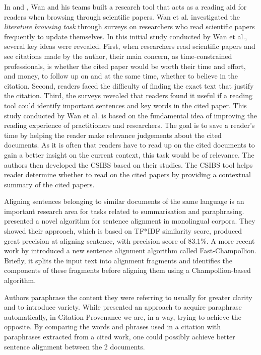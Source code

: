 In \cite{citation-sensitive} and \cite{csibs}, Wan and his teams built a research tool that acts as a reading aid for readers when browsing through scientific papers. Wan et al. investigated the \textit{literature browsing task} through surveys on researchers who read scientific papers frequently to update themselves. In this initial study conducted by Wan et al., several key ideas were revealed. First, when researchers read scientific papers and see citations made by the author, their main concern, as time-constrained professionals, is whether the cited paper would be worth their time and effort, and money, to follow up on and at the same time, whether to believe in the citation. Second, readers faced the difficulty of finding the exact text that justify the citation. Third, the surveys revealed that readers found it useful if a reading tool could identify important sentences and key words in the cited paper. This study conducted by Wan et al. is based on the fundamental idea of improving the reading experience of practitioners and researchers. The goal is to save a reader's time by helping the reader make relevance judgements about the cited documents. As it is often that readers have to read up on the cited documents to gain a better insight on the current context, this task would be of relevance. The authors then developed the CSIBS based on their studies. The CSIBS tool helps reader determine whether to read on the cited papers by providing a contextual summary of the cited papers.

Aligning sentences belonging to similar documents of the same language is an important research area for tasks related to summarisation and paraphrasing. \cite{nelken2006towards} presented a novel algorithm for sentence alignment in monolingual corpora. They showed their approach, which is based on TF*IDF similarity score, produced great precision at aligning sentence, with precision score of 83.1\%. A more recent work by \cite{li2010fast} introduced a new sentence alignment algorithm called Fast-Champollion. Briefly, it splits the input text into alignment fragments and identifies the components of these fragments before aligning them using a Champollion-based algorithm.

Authors paraphrase the content they were referring to usually for greater clarity and to introduce variety. While \cite{shinyama2002automatic} presented an approach to acquire paraphrase automatically, in Citation Provenance we are, in a way, trying to achieve the opposite. By comparing the words and phrases used in a citation with paraphrases extracted from a cited work, one could possibly achieve better sentence alignment between the 2 documents.